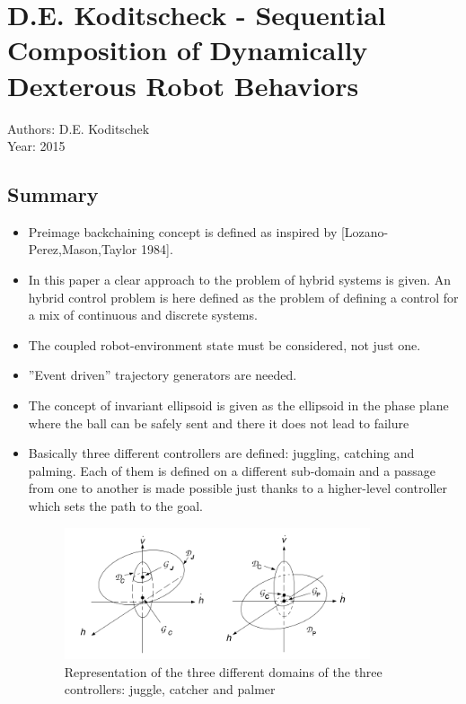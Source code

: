 \section{D.E. Koditscheck - Sequential Composition of Dynamically Dexterous Robot Behaviors}
Authors: D.E. Koditschek\\
Year: 2015
\subsection*{Summary}
\begin{itemize}
\item Preimage backchaining concept is defined as inspired by [Lozano-Perez,Mason,Taylor 1984].
\item In this paper a clear approach to the problem of hybrid systems is given. An hybrid control problem is here defined as the problem of defining a control for a mix of continuous and discrete systems.
\item The coupled robot-environment state must be considered, not just one.
\item ''Event driven'' trajectory generators are needed.
\item The concept of invariant ellipsoid is given as the ellipsoid in the phase plane where the ball can be safely sent and there it does not lead to failure
\item Basically three different controllers are defined: juggling, catching and palming. Each of them is defined on a different sub-domain and a passage from one to another is made possible just thanks to a higher-level controller which sets the path to the goal.
\begin{figure}
  \centering
  \includegraphics[width=90mm]{Koditschek1}
  \caption{Representation of the three different domains of the three controllers: juggle, catcher and palmer}
  \label{PhasePlane}
\end{figure}
\end{itemize}

